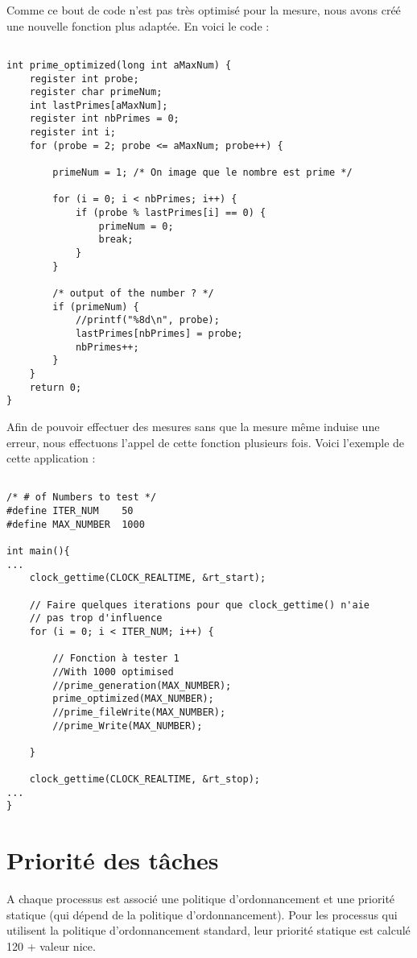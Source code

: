 \pagebreak Comme ce bout de code n'est pas très optimisé pour la mesure, nous avons créé une nouvelle fonction plus adaptée. En voici le code :

\begin{lstlisting}[frame=single,style=C]  % Start your code-block

int prime_optimized(long int aMaxNum) {
	register int probe;
	register char primeNum;
	int lastPrimes[aMaxNum];
	register int nbPrimes = 0;
	register int i;
	for (probe = 2; probe <= aMaxNum; probe++) {

		primeNum = 1; /* On image que le nombre est prime */

		for (i = 0; i < nbPrimes; i++) {
			if (probe % lastPrimes[i] == 0) {
				primeNum = 0;
				break;
			}
		}

		/* output of the number ? */
		if (primeNum) {
			//printf("%8d\n", probe);
			lastPrimes[nbPrimes] = probe;
			nbPrimes++;
		}
	}
	return 0;
}
\end{lstlisting} 
 
Afin de pouvoir effectuer des mesures sans que la mesure même induise une erreur, nous effectuons l'appel de cette fonction plusieurs fois. Voici l'exemple de cette application :

\begin{lstlisting}[frame=single,style=C]  % Start your code-block

/* # of Numbers to test */
#define ITER_NUM	50
#define MAX_NUMBER 	1000

int main(){
...
	clock_gettime(CLOCK_REALTIME, &rt_start);

	// Faire quelques iterations pour que clock_gettime() n'aie
	// pas trop d'influence
	for (i = 0; i < ITER_NUM; i++) {

		// Fonction à tester 1
		//With 1000 optimised
		//prime_generation(MAX_NUMBER);
		prime_optimized(MAX_NUMBER);
		//prime_fileWrite(MAX_NUMBER);
		//prime_Write(MAX_NUMBER);

	}

	clock_gettime(CLOCK_REALTIME, &rt_stop);
...
}
\end{lstlisting} 

\pagebreak \section{Priorité des tâches}

A chaque processus est associé une politique d'ordonnancement et une priorité statique (qui dépend de la politique d'ordonnancement). Pour les processus qui utilisent la politique d'ordonnancement standard, leur priorité statique est calculé 120 + valeur nice. 

